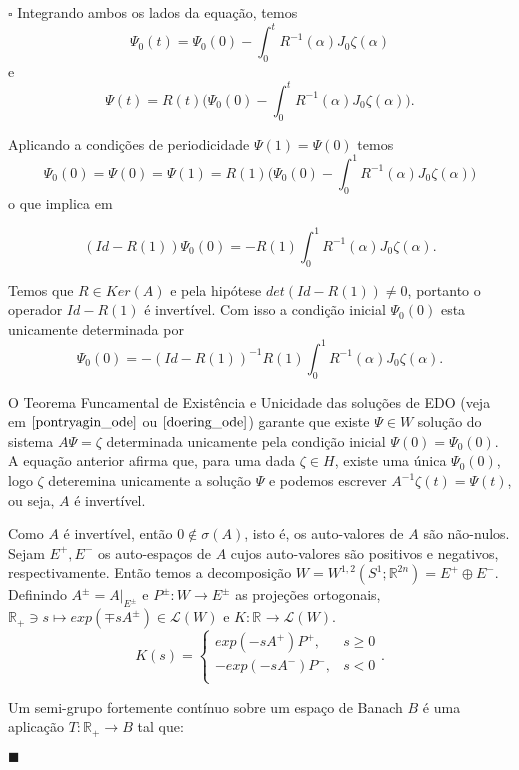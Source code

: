 \documentclass[12pt]{book}
\newenvironment{prova}[1]{$\square$ #1}{\hfill$\blacksquare$}
\newcommand{\circulo}{S^{1}}
\newcommand{\espacosobolevgeral}[2]{W^{1,#1}(#2)}
\newcommand{\estruturacomplexa}{J_{0}}
\newcommand{\funcaocond}[5]{
	#1 = 
	\left\{
	\begin{array}{cc}
		#2, & #3\\
		#4, & #5\\
	\end{array}
	\right.
}
\newcommand{\real}[1]{\mathbb{R}^{#1}}
\begin{document}
\begin{prova}
		Integrando ambos os lados da equação, temos
		$$
		\Psi_{0}(t) = \Psi_{0}(0)-\int_{0}^{t} R^{-1}(\alpha)\estruturacomplexa \zeta(\alpha)
		$$
		e
		$$
		\Psi(t) = R(t)\Big(\Psi_{0}(0)-\int_{0}^{t} R^{-1}(\alpha)\estruturacomplexa \zeta(\alpha)\Big).
		$$
		
		Aplicando a condições de periodicidade $\Psi(1) = \Psi(0)$ temos
		$$
		\Psi_{0}(0)=\Psi(0)=\Psi(1)=R(1)\Big(\Psi_{0}(0)-\int_{0}^{1} R^{-1}(\alpha)\estruturacomplexa \zeta(\alpha)\Big)
		$$
		o que implica em
		
		$$
		(Id - R(1))\Psi_{0}(0) = -R(1)\int_{0}^{1} R^{-1}(\alpha)\estruturacomplexa \zeta(\alpha).
		$$
		
		Temos que $R \in Ker(A)$ e pela hipótese $det(Id - R(1))\neq 0$, portanto o operador $Id - R(1)$ é invertível. Com isso a condição inicial $\Psi_{0}(0)$ esta unicamente determinada por
		$$
		\Psi_{0}(0) = -(Id - R(1))^{-1}R(1)\int_{0}^{1} R^{-1}(\alpha)\estruturacomplexa \zeta(\alpha).
		$$
		
		O Teorema Funcamental de Existência e Unicidade das soluções de EDO (veja em $\cite{pontryagin_ode}$ ou $\cite{doering_ode}$) garante que existe $\Psi \in W$ solução do sistema $A\Psi = \zeta$ determinada unicamente pela condição inicial $\Psi(0) = \Psi_{0}(0)$. A equação anterior afirma que, para uma dada $\zeta \in H$, existe uma única $\Psi_{0}(0)$, logo $\zeta$ deteremina unicamente a solução $\Psi$ e podemos escrever $A^{-1}\zeta(t)=\Psi(t)$, ou seja, $A$ é invertível.
		
		Como $A$ é invertível, então $0 \notin \sigma(A)$, isto é, os auto-valores de $A$ são não-nulos. Sejam $E^{+}, E^{-}$ os auto-espaços de $A$ cujos auto-valores são positivos e negativos, respectivamente. Então temos a decomposição $W = \espacosobolevgeral{2}{\circulo;\real{2n}} = E^{+}\oplus E^{-}$. Definindo $A^{\pm}=A |_{E^{\pm}}$ e $P^{\pm}: W \to E^{\pm}$ as projeções ortogonais, $\real{}_{+} \ni s \mapsto exp(\mp s A^{\pm}) \in \mathcal{L}(W)$ e $K: \real{}\to \mathcal{L}(W)$.
		$$
		\funcaocond{K(s)}{exp(-s A^{+})P^{+}}{s \geq 0}{-exp(-s 	A^{-})P^{-}}{s<0}.
		$$
		
		Um semi-grupo fortemente contínuo sobre um espaço de Banach $B$ é uma aplicação $T:\real{}_{+}\to B$ tal que:
		

\end{prova}
\end{document}
